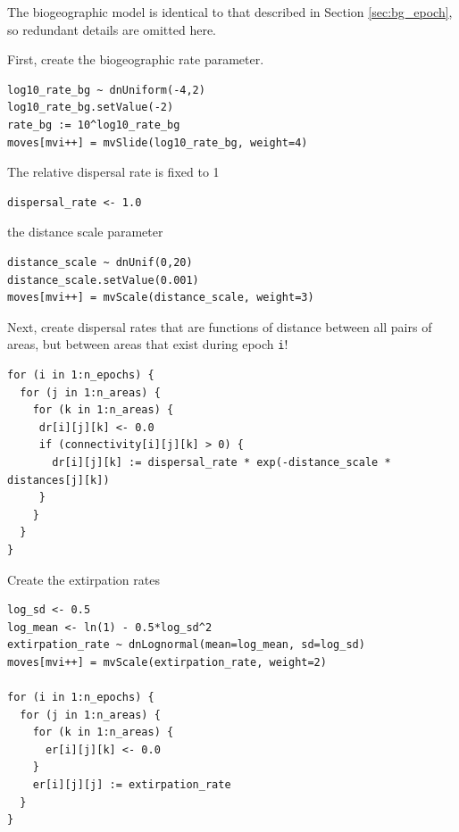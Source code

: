 The biogeographic model is identical to that described in Section \ref{sec:bg_epoch}, so redundant details are omitted here.

First, create the biogeographic rate parameter.

\begin{snugshade}
\begin{lstlisting}
log10_rate_bg ~ dnUniform(-4,2)
log10_rate_bg.setValue(-2)
rate_bg := 10^log10_rate_bg
moves[mvi++] = mvSlide(log10_rate_bg, weight=4)
\end{lstlisting}
\end{snugshade}


The relative dispersal rate is fixed to 1
\begin{snugshade}
\begin{lstlisting}
dispersal_rate <- 1.0
\end{lstlisting}
\end{snugshade}


the distance scale parameter

\begin{snugshade}
\begin{lstlisting}
distance_scale ~ dnUnif(0,20)
distance_scale.setValue(0.001)
moves[mvi++] = mvScale(distance_scale, weight=3)
\end{lstlisting}
\end{snugshade}


Next, create dispersal rates that are functions of distance between all pairs of areas, but between areas that exist during epoch {\tt i}!

\begin{snugshade}
\begin{lstlisting}
for (i in 1:n_epochs) {
  for (j in 1:n_areas) {
    for (k in 1:n_areas) {
     dr[i][j][k] <- 0.0
     if (connectivity[i][j][k] > 0) {
       dr[i][j][k] := dispersal_rate * exp(-distance_scale * distances[j][k])
     }
    }
  }
}
\end{lstlisting}
\end{snugshade}



Create the extirpation rates

\begin{snugshade}
\begin{lstlisting}
log_sd <- 0.5
log_mean <- ln(1) - 0.5*log_sd^2
extirpation_rate ~ dnLognormal(mean=log_mean, sd=log_sd)
moves[mvi++] = mvScale(extirpation_rate, weight=2)

for (i in 1:n_epochs) {
  for (j in 1:n_areas) {
    for (k in 1:n_areas) {
      er[i][j][k] <- 0.0
    }
    er[i][j][j] := extirpation_rate
  }
}

\end{lstlisting}
\end{snugshade}


